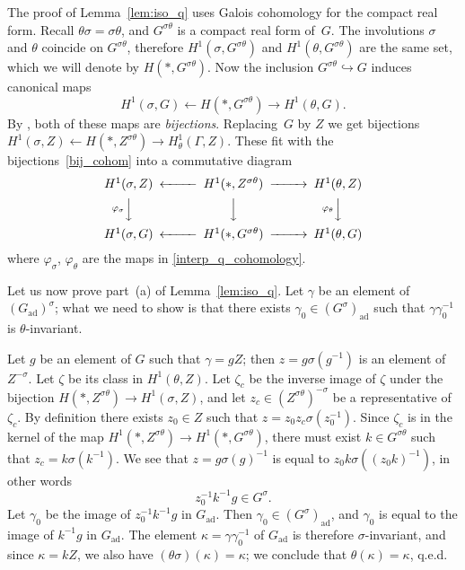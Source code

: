 \documentclass[10pt,leqno]{article}
\numberwithin{equation}{section}
\newcommand{\ad}{\mathrm{ad}}
\newcommand{\Gad}{G_\mathrm{ad}}
\begin{document}
The proof of Lemma~\ref{lem:iso_q} uses Galois cohomology for the compact real form.  Recall $\theta\sigma = \sigma\theta$, and $G^{\sigma\theta}$ is a compact real form of~$G$. 
The involutions $\sigma$ and $\theta$ coincide on $G^{\sigma\theta}$,
therefore  $H^1(\sigma, G^{\sigma\theta})$ and  $H^1(\theta, G^{\sigma\theta})$ are the same set,
which we will denote by  $H(\ast, G^{\sigma\theta})$.
Now the inclusion $G^{\sigma\theta} \hookrightarrow G$ induces canonical maps 
\begin{equation} \label{bij_cohom} H^{1}(\sigma,  G) \longleftarrow H(\ast, G^{\sigma\theta}) \longrightarrow H^{1}(\theta,  G).\end{equation}
By \cite[Corollary~4.4 and Corollary 4.7]{galois}, both of these maps are \emph{bijections}.
Replacing~$G$ by $Z$ we get bijections $H^{1}(\sigma, Z) \leftarrow H(\ast, Z^{\sigma\theta}) \rightarrow H^{1}_{\theta}(\Gamma, Z)$.
These fit with the bijections~\eqref{bij_cohom} into a commutative diagram
\[
\begin{CD}
H^{1}(\sigma, Z) @<<< H^1(\ast, Z^{\sigma\theta})@>>> H^{1}(\theta, Z)
 \\
@V{\varphi_{\sigma}}VV @VVV @V{\varphi_{\theta}}VV  \\
H^{1}(\sigma, G) @<<< H^1(\ast, G^{\sigma\theta})@>>> H^{1}(\theta,  G)
\end{CD}
\]
where $\varphi_\sigma$, $\varphi_\theta$ are the maps in \eqref{interp_q_cohomology}.

Let us now prove part~(a) of Lemma~\ref{lem:iso_q}. Let $\gamma$ be an element of $(\Gad)^\sigma$; what we need to show is that there exists $\gamma_0 \in (G^\sigma)_{\ad}$ such that $\gamma \gamma_0^{-1}$ is $\theta$-invariant. 

Let $g$ be an element of $G$ such that $\gamma = gZ$; then $z=g \sigma(g^{-1})$ is an element of $Z^{-\sigma}$. Let $\zeta$ be its class in $H^{1}(\theta, Z)$. Let $\zeta_c$ be the inverse image of $\zeta$ under the bijection $H(\ast, Z^{\sigma\theta})\to H^{1}(\sigma, Z) $, and let $z_c\in (Z^{\sigma\theta})^{-\sigma}$ be a representative of $\zeta_c$. By definition there exists $z_0 \in Z$ such that $z = z_0 z_c \sigma(z_0^{-1})$. Since $\zeta_c$ is in the kernel of the map $H^1(\ast, Z^{\sigma\theta}) \to H^1(\ast, G^{\sigma\theta})$, there must exist  $k \in G^{\sigma\theta}$  such that $z_c = k \sigma(k^{-1})$. We see that $z = g \sigma(g)^{-1}$ is equal to $z_0 k \sigma((z_0k)^{-1})$, in other words 
\[ z_0^{-1} k^{-1} g \in G^{\sigma}.\]
Let $\gamma_0$ be the image of $z_0^{-1} k^{-1} g$ in $\Gad$. Then $\gamma_0 \in (G^{\sigma})_\ad$, and $\gamma_0$ is equal to the image of $k^{-1} g$ in $\Gad$. The element $\kappa=\gamma \gamma_0^{-1}$ of $\Gad$  is therefore $\sigma$-invariant, and since $\kappa=kZ$, we also have $(\theta\sigma)(\kappa)=\kappa$; we conclude that $\theta(\kappa) = \kappa$, q.e.d. 
\end{document}
